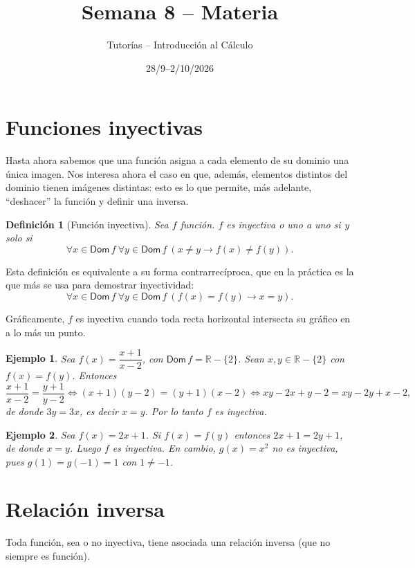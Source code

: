 \documentclass[11pt]{article}
\title{Semana 8 -- Materia}
\author{Tutorías -- Introducción al Cálculo}
\date{28/9--2/10/2026}
\newtheorem*{definicion}{Definición}
\newtheorem*{ejemplo}{Ejemplo}
\begin{document}
\maketitle

\section{Funciones inyectivas}

Hasta ahora sabemos que una función asigna a cada elemento de su dominio una
única imagen. Nos interesa ahora el caso en que, además, elementos distintos
del dominio tienen imágenes distintas: esto es lo que permite, más adelante,
``deshacer'' la función y definir una inversa.

\begin{definicion}[Función inyectiva]
Sea $f$ función. $f$ es inyectiva o uno a uno si y solo si
\[
\forall x \in \mathsf{Dom}\,f\ \forall y \in \mathsf{Dom}\,f\ (x \neq y \to f(x) \neq f(y)).
\]
\end{definicion}

Esta definición es equivalente a su forma contrarrecíproca, que en la práctica
es la que más se usa para demostrar inyectividad:
\[
\forall x \in \mathsf{Dom}\,f\ \forall y \in \mathsf{Dom}\,f\ (f(x) = f(y) \to x = y).
\]

Gráficamente, $f$ es inyectiva cuando toda recta horizontal intersecta su
gráfico en a lo más un punto.

\begin{ejemplo}
Sea $f(x) = \dfrac{x+1}{x-2}$, con $\mathsf{Dom}\,f = \mathbb{R}-\{2\}$.
Sean $x,y \in \mathbb{R}-\{2\}$ con $f(x)=f(y)$. Entonces
\[
\frac{x+1}{x-2} = \frac{y+1}{y-2} \iff (x+1)(y-2) = (y+1)(x-2) \iff xy-2x+y-2 = xy-2y+x-2,
\]
de donde $3y = 3x$, es decir $x=y$. Por lo tanto $f$ es inyectiva.
\end{ejemplo}

\begin{ejemplo}
Sea $f(x) = 2x+1$. Si $f(x) = f(y)$ entonces $2x+1 = 2y+1$, de donde $x=y$.
Luego $f$ es inyectiva. En cambio, $g(x) = x^2$ no es inyectiva, pues
$g(1) = g(-1) = 1$ con $1 \neq -1$.
\end{ejemplo}

\section{Relación inversa}

Toda función, sea o no inyectiva, tiene asociada una relación inversa (que no
siempre es función).
\end{document}
